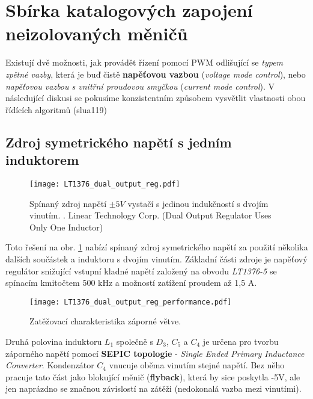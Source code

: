     \newpage
      
    \newpage
      
      

  \section{Sbírka katalogových zapojení neizolo\-va\-ných měničů}
    Existují dvě možnosti, jak provádět řízení pomocí PWM odlišující se \emph{typem zpětné
    vazby}, která je buď čistě \textbf{napěťovou vazbou} (\emph{voltage mode control}), nebo
    \emph{napěťovou vazbou s vnitřní proudovou smyčkou} (\emph{current mode control}). V
    následující diskusi se pokusíme konzistentním způsobem vysvětlit vlastnosti obou řídících
    algoritmů (slua119)
    
    \subsection{Zdroj symetrického napětí s jedním induktorem}
      \begin{figure}
        \centering
        \texttt{[image: LT1376\_dual\_output\_reg.pdf]}
        \caption[Spínaný zdroj napětí $\pm5 V$ vystačí s jedinou indukčností s dvojím
                 vinutím]{Spínaný zdroj napětí $\pm5 V$ vystačí s jedinou indukčností s dvojím
                 vinutím. \cite{DN100}. Linear Technology Corp. (Dual Output Regulator Uses Only
                 One Inductor)}
        \label{enz:fig_LT1376_cir1}
      \end{figure}
      Toto řešení na obr. \ref{enz:fig_LT1376_cir1} nabízí spínaný zdroj symetrického napětí za
      použití několika dalších součástek a induktoru s dvojím vinutím. Základní části zdroje je
      napěťový regulátor snižující vstupní kladné napětí založený na obvodu \emph{LT1376-5} se
      spínacím kmitočtem 500 kHz a možností zatížení proudem až 1,5 A.

      \begin{figure}
        \centering
        \texttt{[image: LT1376\_dual\_output\_reg\_performance.pdf]}
        \caption{Zatěžovací charakteristika záporné větve.}
        \label{enz:fig_LT1376_cir1_perform}
      \end{figure}

      Druhá polovina induktoru $L_1$ společně s $D_3$, $C_5$ a $C_4$ je určena pro tvorbu
      záporného napětí pomocí \textbf{SEPIC topologie} - \emph{Single Ended Primary Inductance
      Converter}. Kondenzátor $C_4$ vnucuje oběma vinutím stejné napětí. Bez něho pracuje tato
      část jako blokující měnič (\textbf{flyback}), která by sice poskytla -5V, ale jen naprázdno
      se značnou závislostí na zátěži (nedokonalá vazba mezi vinutími).
